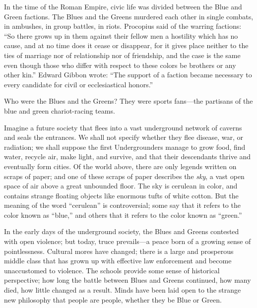 {
 In the time of the Roman Empire, civic life was divided between
the Blue and Green factions. The Blues and the Greens murdered each
other in single combats, in ambushes, in group battles, in riots.
Procopius said of the warring factions: ``So there
grows up in them against their fellow men a hostility which has no
cause, and at no time does it cease or disappear, for it gives place
neither to the ties of marriage nor of relationship nor of friendship,
and the case is the same even though those who differ with respect to
these colors be brothers or any other
kin.'' Edward Gibbon wrote:
``The support of a faction became necessary to every
candidate for civil or ecclesiastical
honors.'' }

{
 Who were the Blues and the Greens? They were sports fans---the
partisans of the blue and green chariot-racing teams.}

{
 Imagine a future society that flees into a vast underground
network of caverns and seals the entrances. We shall not specify
whether they flee disease, war, or radiation; we shall suppose the
first Undergrounders manage to grow food, find water, recycle air, make
light, and survive, and that their descendants thrive and eventually
form cities. Of the world above, there are only legends written on
scraps of paper; and one of these scraps of paper describes the
\textit{sky}, a vast open space of air above a great unbounded floor.
The sky is cerulean in color, and contains strange floating objects
like enormous tufts of white cotton. But the meaning of the word
``cerulean'' is controversial; some
say that it refers to the color known as
``blue,'' and others that it refers
to the color known as ``green.''}

{
 In the early days of the underground society, the Blues and Greens
contested with open violence; but today, truce prevails---a peace born
of a growing sense of pointlessness. Cultural mores have changed; there
is a large and prosperous middle class that has grown up with effective
law enforcement and become unaccustomed to violence. The schools
provide some sense of historical perspective; how long the battle
between Blues and Greens continued, how many died, how little changed
as a result. Minds have been laid open to the strange new philosophy
that people are people, whether they be Blue or Green.}

